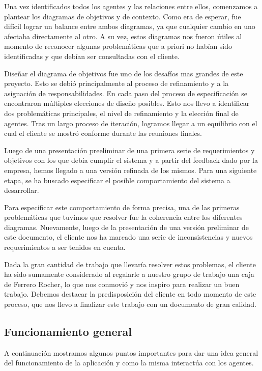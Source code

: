 \documentclass{article}
\theoremstyle{definition}
\theoremstyle{remark}
\begin{document}
Una vez identificados todos los agentes y las relaciones entre ellos, comenzamos a plantear los diagramas de objetivos y de contexto. Como era de esperar, fue difícil lograr un balance entre ambos diagramas, ya que cualquier cambio en uno afectaba directamente al otro. A su vez, estos diagramas nos fueron útiles al momento de reconocer algunas problemáticas que a priori no habían sido identificadas y que debían ser consultadas con el cliente.

Diseñar el diagrama de objetivos fue uno de los desafíos mas grandes de este proyecto. Esto se debió principalmente al proceso de refinamiento y a la asignación de responsabilidades. En cada paso del proceso de especificación se encontraron múltiples elecciones de diseño posibles. Esto nos llevo a identificar dos problemáticas principales, el nivel de refinamiento y la elección final de agentes. Tras un largo proceso de iteración, logramos llegar a un equilibrio con el cual el cliente se mostró conforme durante las reuniones finales.

Luego de una presentación preeliminar de una primera serie de requerimientos y objetivos con los que debía cumplir el sistema y a partir del feedback dado por la empresa, hemos llegado a una versión refinada de los mismos. Para una siguiente etapa, se ha buscado especificar el posible comportamiento del sistema a desarrollar.

Para especificar este comportamiento de forma precisa, una de las primeras problemáticas que tuvimos que resolver fue la coherencia entre los diferentes diagramas. Nuevamente, luego de la presentación de una versión preliminar de este documento, el cliente nos ha marcado una serie de inconsistencias y nuevos requerimientos a ser tenidos en cuenta. 

Dada la gran cantidad de trabajo que llevaría resolver estos problemas, el cliente ha sido sumamente considerado al regalarle a nuestro grupo de trabajo una caja de Ferrero Rocher, lo que nos conmovió y nos inspiro para realizar un buen trabajo. Debemos destacar la predisposición del cliente en todo momento de este proceso, que nos llevo a finalizar este trabajo con un documento de gran calidad.

\subsection{Funcionamiento general}

A continuación mostramos algunos puntos importantes para dar una idea general del funcionamiento de la aplicación y como la misma interactúa con los agentes.
\end{document}
